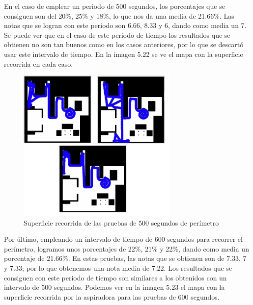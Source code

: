En el caso de emplear un periodo de 500 segundos, los porcentajes que se consiguen son del 20\%, 25\% y 18\%, lo que nos da una media de 21.66\%. Las notas que se logran con este periodo son 6.66, 8.33 y 6, dando como media un 7. Se puede ver que en el caso de este periodo de tiempo los resultados que se obtienen no son tan buenos como en los casos anteriores, por lo que se descartó usar este intervalo de tiempo. En la imagen 5.22 se ve el mapa con la superficie recorrida en cada caso.\\

\begin{figure}[H]
  \begin{center}
    \includegraphics[width=0.7\textwidth]{figures/Vacuum/Referee500.png}
		\caption{Superficie recorrida de las pruebas de 500 segundos de perímetro}
		\label{fig.Referee500}
		\end{center}
\end{figure}

Por último, empleando un intervalo de tiempo de 600 segundos para recorrer el perímetro, logramos unos porcentajes de 22\%, 21\% y 22\%, dando como media un porcentaje de 21.66\%. En estas pruebas, las notas que se obtienen son de 7.33, 7 y 7.33; por lo que obtenemos una nota media de 7.22. Los resultados que se consiguen con este periodo de tiempo son similares a los obtenidos con un intervalo de 500 segundos. Podemos ver en la imagen 5.23 el mapa con la superficie recorrida por la aspiradora para las pruebas de 600 segundos. \\

